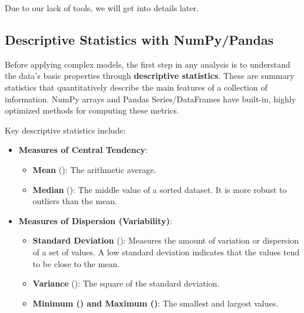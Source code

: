 \noindent Due to our lack of tools, we will get into details later.

\subsection{Descriptive Statistics with NumPy/Pandas}
\label{subsec:descriptive_stats}
Before applying complex models, the first step in any analysis is to understand the data's basic properties through \textbf{descriptive statistics}. These are summary statistics that quantitatively describe the main features of a collection of information. NumPy arrays and Pandas Series/DataFrames have built-in, highly optimized methods for computing these metrics.

Key descriptive statistics include:
\begin{itemize}
    \item \textbf{Measures of Central Tendency}:
    \begin{itemize}
        \item \textbf{Mean} (): The arithmetic average.
        \item \textbf{Median} (): The middle value of a sorted dataset. It is more robust to outliers than the mean.
    \end{itemize}
    \item \textbf{Measures of Dispersion (Variability)}:
    \begin{itemize}
        \item \textbf{Standard Deviation} (): Measures the amount of variation or dispersion of a set of values. A low standard deviation indicates that the values tend to be close to the mean.
        \item \textbf{Variance} (): The square of the standard deviation.
        \item \textbf{Minimum () and Maximum ()}: The smallest and largest values.
    \end{itemize}
\end{itemize}

